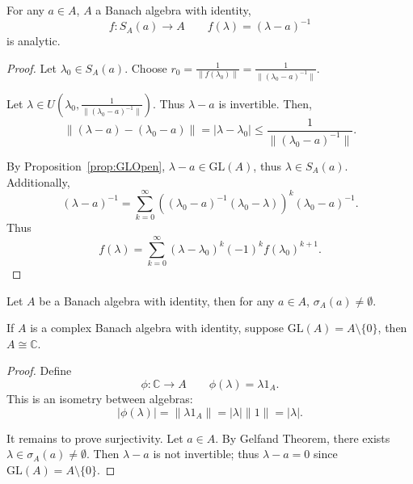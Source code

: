 
\begin{proposition}
	\label{prop:ResolvantAnalytic}

	For any $a \in A$, $A$ a Banach algebra with identity, 
	\[
		f: S_A(a) \to A \qquad f(\lambda) = (\lambda - a)^{-1}
	\] 
	is analytic.
\end{proposition}
\begin{proof}
	Let $\lambda_0 \in S_A(a)$. Choose $r_0 = \frac{1}{\|f(\lambda_0)\|} = \frac{1}{\|(\lambda_0 - a)^{- 1}\|}$.

	Let $\lambda \in U\left( \lambda_0, \frac{1}{\|(\lambda_0 - a)^{-1}\|} \right) $. Thus $\lambda - a$ is invertible. Then,
	\[
		\|(\lambda - a) - (\lambda_0 - a)\| = |\lambda - \lambda_0| \le \frac{1}{\|(\lambda _0 - a)^{- 1}\|}
	.\] 

	By Proposition~\ref{prop:GLOpen}, $\lambda - a \in \text{GL}(A)$, thus $\lambda \in S_A(a)$. Additionally,
	\[
		(\lambda - a)^{- 1} = 
		\sum_{k=0}^{\infty} \left( (\lambda_0 - a)^{- 1} (\lambda_0 - \lambda) \right) ^k (\lambda_0 - a)^{- 1}
	.\] 
	Thus
	\[
		f(\lambda) = \sum_{k=0}^{\infty} (\lambda- \lambda_0)^k (-1)^k f(\lambda_0)^{k + 1}
	.\] 
\end{proof}



\begin{theorem}
	\label{thm:Gelfand}

	Let $A$ be a Banach algebra with identity, then for any $a \in A$, $\sigma_A(a) \neq \emptyset $.

\end{theorem}
\begin{corollary}
	\label{cor:GelfandMazur}

	If $A$ is a complex Banach algebra with identity, suppose $\text{GL}(A) = A \setminus \{0\} $, then $A \cong \mathbb{C}$.
\end{corollary}
\begin{proof}
	Define
	 \[
		\phi: \mathbb{C} \to A \qquad \phi(\lambda) = \lambda 1_{A}
	.\] 
	This is an isometry between algebras:
	\[
		\left| \phi(\lambda) \right| = \|\lambda 1_A\| = |\lambda| \|1\| = |\lambda| .\] 

	It remains to prove surjectivity. Let $a \in A$. By Gelfand Theorem, there exists $\lambda \in \sigma_A(a) \neq \emptyset $. Then $\lambda - a$ is not invertible; thus $\lambda - a = 0$ since $\text{GL}(A) = A \setminus \{0\} $.
\end{proof}

